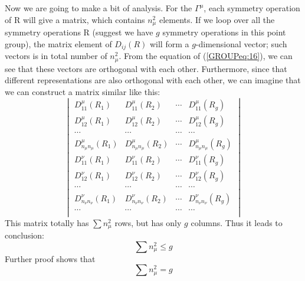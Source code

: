 Now we are going to make a bit of analysis. For the $\Gamma^{\mu}$,
each symmetry operation of R will give a matrix, which contains
$n_{\mu}^{2}$ elements. If we loop over all the symmetry operations R
(suggest we have $g$ symmetry operations in this point group), the
matrix element of $D_{ij}(R)$ will form a $g$-dimensional vector; such
vectors is in total number of $n_{\mu}^{2}$. From the equation of
(\ref{GROUPeq:16}), we can see that these vectors are orthogonal with
each other. Furthermore, since that different representations are also
orthogonal with each other, we can imagine that we can construct a
matrix similar like this:
\begin{equation}\label{}
  \begin{vmatrix}
    D_{11}^{\mu}(R_{1})             & D_{11}^{\mu}(R_{2})             & \cdots &  D_{11}^{\mu}(R_{g})              \\
    D_{12}^{\mu}(R_{1})             & D_{12}^{\mu}(R_{2})             & \cdots &  D_{12}^{\mu}(R_{g})              \\
    \cdots                          & \cdots                          & \cdots &  \cdots                           \\
    D_{n_{\mu}n_{\mu}}^{\mu}(R_{1}) & D_{n_{\mu}n_{\mu}}^{\mu}(R_{2}) & \cdots &  D_{n_{\mu}n_{\mu}}^{\mu}(R_{g})  \\
    D_{11}^{\nu}(R_{1})             & D_{11}^{\nu}(R_{2})             & \cdots &  D_{11}^{\nu}(R_{g})              \\
    D_{12}^{\nu}(R_{1})             & D_{12}^{\nu}(R_{2})             & \cdots &  D_{12}^{\nu}(R_{g})              \\
    \cdots                          & \cdots                          & \cdots &  \cdots                           \\
    D_{n_{\nu}n_{\nu}}^{\nu}(R_{1}) & D_{n_{\nu}n_{\nu}}^{\nu}(R_{2}) & \cdots &  D_{n_{\nu}n_{\nu}}^{\nu}(R_{g})  \\
    \cdots                          & \cdots                          & \cdots &  \cdots                           \\
  \end{vmatrix}
\end{equation}
This matrix totally has $\sum n_{\mu}^{2}$ rows, but has only $g$
columns. Thus it leads to conclusion:
\begin{equation}\label{}
  \sum n_{\mu}^{2} \leq g
\end{equation}
Further proof shows that
\begin{equation}\label{}
  \sum n_{\mu}^{2} = g
\end{equation}

